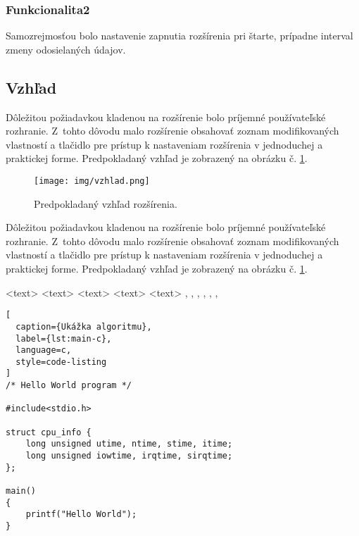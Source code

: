 \subsubsection{Funkcionalita2}
\noindent Samozrejmosťou bolo nastavenie zapnutia rozšírenia pri štarte, prípadne interval zmeny odosielaných údajov.

\subsection{Vzhľad}
\noindent Dôležitou požiadavkou kladenou na rozšírenie bolo príjemné používateľské rozhranie. Z~tohto dôvodu malo rozšírenie obsahovať zoznam modifikovaných vlastností a tlačidlo pre prístup k nastaveniam rozšírenia v jednoduchej a praktickej forme. Predpokladaný vzhľad je zobrazený na obrázku č. \ref{vzhladobr}.
\begin{figure}[!htbp]
  \centering
  \texttt{[image: img/vzhlad.png]}
  \caption{Predpokladaný vzhľad rozšírenia.}
  \label{vzhladobr}
\end{figure}	 
\noindent Dôležitou požiadavkou kladenou na rozšírenie bolo príjemné používateľské rozhranie.\cite{t00} Z~tohto dôvodu malo rozšírenie obsahovať zoznam modifikovaných vlastností a tlačidlo pre prístup k nastaveniam rozšírenia v jednoduchej a praktickej forme. Predpokladaný vzhľad je zobrazený na obrázku č. \ref{vzhladobr}.

\begin{algorithm}
\scriptsize
\begin{algorithmic}
 \STATE <text>
   \ELSE {} \ENDIF
     \ENDIF
   \ENDFOR
   \ENDFOR
   \ENDFOR
   \ENDWHILE
 \REPEAT {} 
 \LOOP {} \ENDLOOP
 \REQUIRE <text>
 \ENSURE <text>
 \RETURN <text>
 \PRINT <text>
 \AND, \OR, \XOR, \NOT, \TO, \TRUE, \FALSE
\end{algorithmic}
\caption{Ukážka príkazov pre algorithmic}  
\label{alg:preview}  
\end{algorithm}

\begin{lstlisting}[
  caption={Ukážka algoritmu},
  label={lst:main-c},
  language=c,
  style=code-listing
]
/* Hello World program */

#include<stdio.h>

struct cpu_info {
    long unsigned utime, ntime, stime, itime;
    long unsigned iowtime, irqtime, sirqtime;
};

main()
{
    printf("Hello World");
}
\end{lstlisting}
